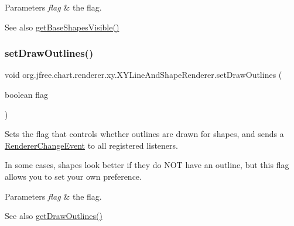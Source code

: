 \begin{DoxyParams}{Parameters}
{\em flag} & the flag.\\
\hline
\end{DoxyParams}
\begin{DoxySeeAlso}{See also}
\mbox{\hyperlink{classorg_1_1jfree_1_1chart_1_1renderer_1_1xy_1_1_x_y_line_and_shape_renderer_a5aebca1dfd44e8f4a0a9dee475b5f2f8}{get\+Base\+Shapes\+Visible()}} 
\end{DoxySeeAlso}
\mbox{\label{classorg_1_1jfree_1_1chart_1_1renderer_1_1xy_1_1_x_y_line_and_shape_renderer_a243b4dca74d9d904b9513977feaf7bcc}} 
\subsubsection{\texorpdfstring{set\+Draw\+Outlines()}{setDrawOutlines()}}
{\footnotesize\ttfamily void org.\+jfree.\+chart.\+renderer.\+xy.\+X\+Y\+Line\+And\+Shape\+Renderer.\+set\+Draw\+Outlines (\begin{DoxyParamCaption}\item[{boolean}]{flag }\end{DoxyParamCaption})}

Sets the flag that controls whether outlines are drawn for shapes, and sends a \mbox{\hyperlink{}{Renderer\+Change\+Event}} to all registered listeners. 

In some cases, shapes look better if they do N\+OT have an outline, but this flag allows you to set your own preference.


\begin{DoxyParams}{Parameters}
{\em flag} & the flag.\\
\hline
\end{DoxyParams}
\begin{DoxySeeAlso}{See also}
\mbox{\hyperlink{classorg_1_1jfree_1_1chart_1_1renderer_1_1xy_1_1_x_y_line_and_shape_renderer_ada74b3f515bd82c1b1a113dd819d7d18}{get\+Draw\+Outlines()}} 
\end{DoxySeeAlso}
\mbox{\label{classorg_1_1jfree_1_1chart_1_1renderer_1_1xy_1_1_x_y_line_and_shape_renderer_a55209b5160cfc29ae9e3688812655389}} 
